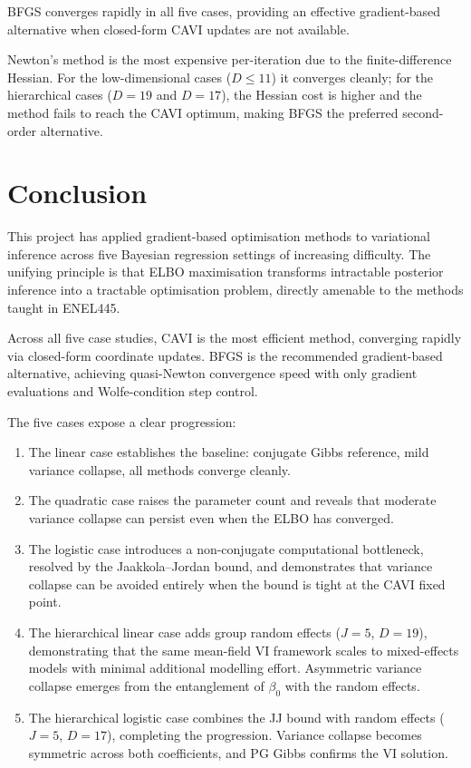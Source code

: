 \documentclass[11pt,a4paper]{article}
\begin{document}
BFGS converges rapidly in all five cases, providing an effective gradient-based
alternative when closed-form CAVI updates are not available.

Newton's method is the most expensive per-iteration due to the finite-difference
Hessian.
For the low-dimensional cases ($D \leq 11$) it converges cleanly; for the hierarchical
cases ($D=19$ and $D=17$), the Hessian cost is higher and the method fails to reach
the CAVI optimum, making BFGS the preferred second-order alternative.

\section*{Conclusion}

This project has applied gradient-based optimisation methods to variational inference
across five Bayesian regression settings of increasing difficulty.
The unifying principle is that ELBO maximisation transforms intractable posterior
inference into a tractable optimisation problem, directly amenable to the methods
taught in ENEL445.

Across all five case studies, CAVI is the most efficient method, converging rapidly
via closed-form coordinate updates.
BFGS is the recommended gradient-based alternative, achieving quasi-Newton convergence
speed with only gradient evaluations and Wolfe-condition step control.

The five cases expose a clear progression:
\begin{enumerate}
  \item The linear case establishes the baseline: conjugate Gibbs reference, mild
    variance collapse, all methods converge cleanly.
  \item The quadratic case raises the parameter count and reveals that moderate variance
    collapse can persist even when the ELBO has converged.
  \item The logistic case introduces a non-conjugate computational bottleneck, resolved
    by the Jaakkola--Jordan bound, and demonstrates that variance collapse can be
    avoided entirely when the bound is tight at the CAVI fixed point.
  \item The hierarchical linear case adds group random effects ($J=5$, $D=19$),
    demonstrating that the same mean-field VI framework scales to mixed-effects models
    with minimal additional modelling effort. Asymmetric variance collapse emerges
    from the entanglement of $\beta_0$ with the random effects.
  \item The hierarchical logistic case combines the JJ bound with random effects
    ($J=5$, $D=17$), completing the progression. Variance collapse becomes symmetric
    across both coefficients, and PG Gibbs confirms the VI solution.
\end{enumerate}
\end{document}
